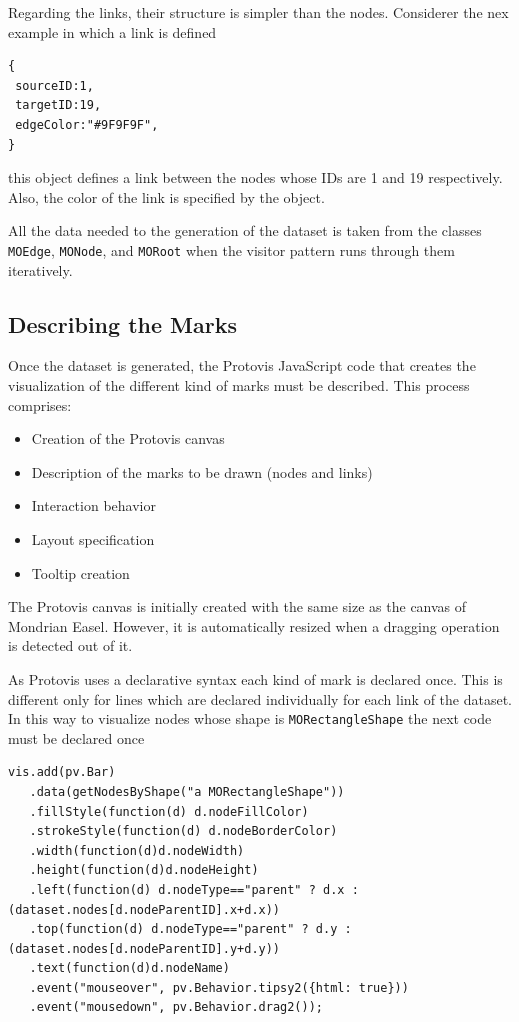 \documentclass[preprint,10pt]{sigplanconf}
\newcommand{\ct}{\lstinline[backgroundcolor=\color{white},basicstyle=\footnotesize\ttfamily]}
\newcommand{\sv}[1]{\nb{Santiago}{orange}{#1}}
\begin{document}
Regarding the links, their structure is simpler than the nodes. Considerer the nex example in which a link is defined
\begin{lstlisting} 
{
 sourceID:1, 
 targetID:19,
 edgeColor:"#9F9F9F",
}
\end{lstlisting}
this object defines a link between the nodes whose IDs are 1 and 19 respectively. Also, the color of the link is specified by the object. 

All the data needed to the generation of the dataset is taken from the classes \ct{MOEdge}, \ct{MONode}, and \ct{MORoot} when the visitor pattern runs through them iteratively.


\subsection{Describing the Marks}

Once the dataset is generated, the Protovis JavaScript code that creates the visualization of the different kind of marks must be described. This process comprises: 
\begin{itemize}
\item Creation of the Protovis canvas
\item Description of the marks to be drawn (nodes and links)
\item Interaction behavior
\item Layout specification
\item Tooltip creation
\end{itemize}

The Protovis canvas is initially created with the same size as the canvas of Mondrian Easel. However, it is automatically resized when a dragging operation is detected out of it.

As Protovis uses a declarative syntax each kind of mark is declared once. This is different only for lines which are declared individually for each link of the dataset. In this way to visualize nodes whose shape is \ct{MORectangleShape} the next code must be declared once
\begin{lstlisting} 
vis.add(pv.Bar)
   .data(getNodesByShape("a MORectangleShape"))
   .fillStyle(function(d) d.nodeFillColor)
   .strokeStyle(function(d) d.nodeBorderColor)
   .width(function(d)d.nodeWidth)
   .height(function(d)d.nodeHeight)
   .left(function(d) d.nodeType=="parent" ? d.x : (dataset.nodes[d.nodeParentID].x+d.x))
   .top(function(d) d.nodeType=="parent" ? d.y : (dataset.nodes[d.nodeParentID].y+d.y))
   .text(function(d)d.nodeName)
   .event("mouseover", pv.Behavior.tipsy2({html: true}))
   .event("mousedown", pv.Behavior.drag2());
\end{lstlisting}
\end{document}
